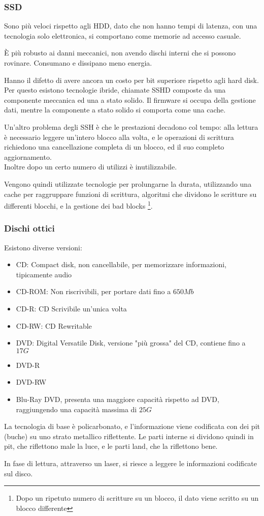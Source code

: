 \documentclass[../template]{subfiles}
\begin{document}
\subsubsection{SSD}
Sono più veloci rispetto agli HDD, dato che non hanno tempi di latenza, con una tecnologia solo elettronica, si comportano come memorie ad accesso casuale.

È più robusto ai danni meccanici, non avendo dischi interni che si possono rovinare. Consumano e dissipano meno energia.

Hanno il difetto di avere ancora un costo per bit superiore rispetto agli hard disk. Per questo esistono tecnologie ibride, chiamate SSHD composte da una componente meccanica ed una a stato solido. Il firmware si occupa della gestione dati, mentre la componente a stato solido si comporta come una cache.

Un'altro problema degli SSH è che le prestazioni decadono col tempo: alla lettura è necessario leggere un'intero blocco alla volta, e le operazioni di scrittura richiedono una cancellazione completa di un blocco, ed il suo completo aggiornamento.
\\
Inoltre dopo un certo numero di utilizzi è inutilizzabile.

Vengono quindi utilizzate tecnologie per prolungarne la durata, utilizzando una cache per raggruppare funzioni di scrittura, algoritmi che dividono le scritture su differenti blocchi, e la gestione dei bad blocks \footnote{Dopo un ripetuto numero di scritture su un blocco, il dato viene scritto su un blocco differente}.

\subsubsection{Dischi ottici}
Esistono diverse versioni:
\begin{itemize}
    \item CD: Compact disk, non cancellabile, per memorizzare informazioni, tipicamente audio
    \item CD-ROM: Non riscrivibili, per portare dati fino a $650Mb$
    \item CD-R: CD Scrivibile un'unica volta
    \item CD-RW: CD Rewritable
    \item DVD: Digital Versatile Disk, versione "più grossa" del CD, contiene fino a $17G$
    \item DVD-R
    \item DVD-RW
    \item Blu-Ray DVD, presenta una maggiore capacità rispetto ad DVD, raggiungendo una capacità massima di $25G$
\end{itemize}

La tecnologia di base è policarbonato, e l'informazione viene codificata con dei pit (buche) su uno strato metallico riflettente.
Le parti interne si dividono quindi in pit, che riflettono male la luce, e le parti land, che la riflettono bene.

In fase di lettura, attraverso un laser, si riesce a leggere le informazioni codificate sul disco.
\end{document}
